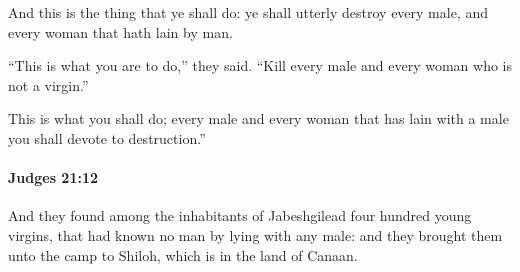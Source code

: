 			\begin{versebox}
					\item[BHS] 
					\item[ASV] And this is the thing that ye shall do: ye shall utterly destroy every male, and every woman that hath lain by man.
					\item[NIV] “This is what you are to do,” they said. “Kill every male and every woman who is not a virgin.”
					\item[NRSV] This is what you shall do; every male and every woman that has lain with a male you shall devote to destruction.”
			\end{versebox}

		\paragraph{Judges 21:12} %
			\label{JUDGES-21-12}

			And they found among the inhabitants of Jabeshgilead four hundred young virgins, that had known no man by lying with any male: and they brought them unto the camp to Shiloh, which is in the land of Canaan.

